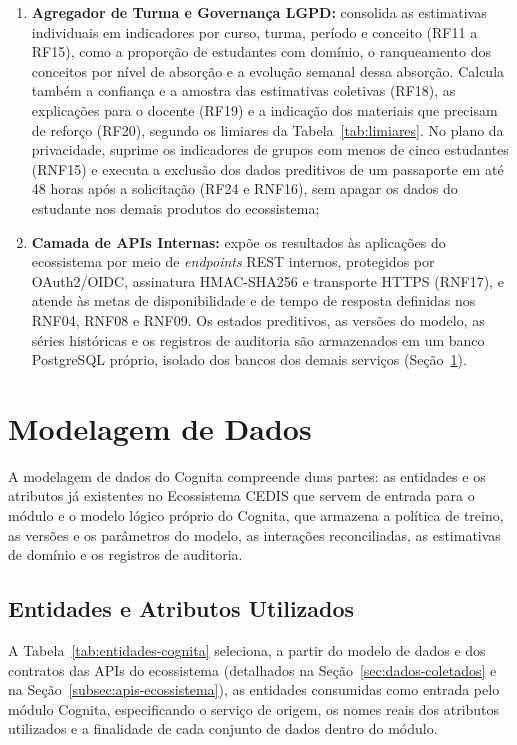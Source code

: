 \begin{enumerate}
    \item \textbf{Agregador de Turma e Governança LGPD:} consolida as estimativas individuais em indicadores por curso, turma, período e conceito (RF11 a RF15), como a proporção de estudantes com domínio, o ranqueamento dos conceitos por nível de absorção e a evolução semanal dessa absorção. Calcula também a confiança e a amostra das estimativas coletivas (RF18), as explicações para o docente (RF19) e a indicação dos materiais que precisam de reforço (RF20), segundo os limiares da Tabela~\ref{tab:limiares}. No plano da privacidade, suprime os indicadores de grupos com menos de cinco estudantes (RNF15) e executa a exclusão dos dados preditivos de um passaporte em até 48 horas após a solicitação (RF24 e RNF16), sem apagar os dados do estudante nos demais produtos do ecossistema;
    \item \textbf{Camada de APIs Internas:} expõe os resultados às aplicações do ecossistema por meio de \textit{endpoints} REST internos, protegidos por OAuth2/OIDC, assinatura HMAC-SHA256 e transporte HTTPS (RNF17), e atende às metas de disponibilidade e de tempo de resposta definidas nos RNF04, RNF08 e RNF09. Os estados preditivos, as versões do modelo, as séries históricas e os registros de auditoria são armazenados em um banco PostgreSQL próprio, isolado dos bancos dos demais serviços (Seção~\ref{sec:modelagem-dados}).
\end{enumerate}


\section{Modelagem de Dados}
\label{sec:modelagem-dados}

A modelagem de dados do Cognita compreende duas partes: as entidades e os atributos já existentes no Ecossistema CEDIS que servem de entrada para o módulo e o modelo lógico próprio do Cognita, que armazena a política de treino, as versões e os parâmetros do modelo, as interações reconciliadas, as estimativas de domínio e os registros de auditoria.

\subsection{Entidades e Atributos Utilizados}
\label{subsec:entidades-utilizadas}

A Tabela~\ref{tab:entidades-cognita} seleciona, a partir do modelo de dados e dos contratos das APIs do ecossistema (detalhados na Seção~\ref{sec:dados-coletados} e na Seção~\ref{subsec:apis-ecossistema}), as entidades consumidas como entrada pelo módulo Cognita, especificando o serviço de origem, os nomes reais dos atributos utilizados e a finalidade de cada conjunto de dados dentro do módulo.

